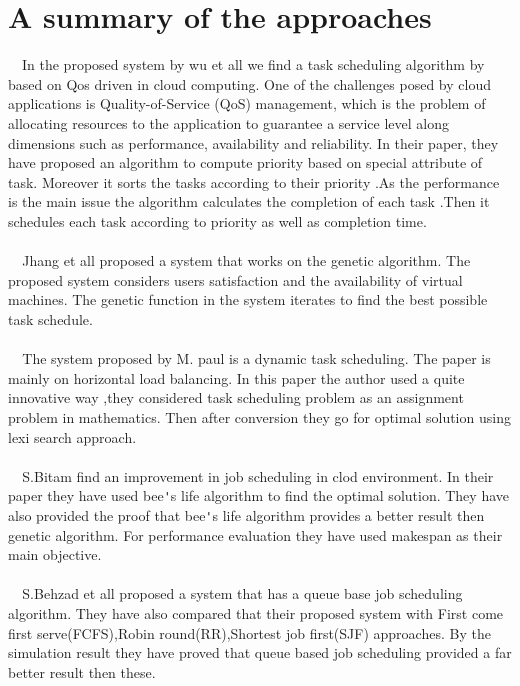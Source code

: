\documentclass{report}
\begin{document}
\tableofcontents
\listoffigures
\listoftables
\chapter{A summary of the approaches}
~~In the proposed system by wu et all  we find a task scheduling algorithm by based on Qos driven in cloud computing. One of the challenges posed by cloud applications is Quality-of-Service (QoS) management, which is the problem of allocating resources to the application to guarantee a service level along dimensions such as performance, availability and reliability. In their paper, they have proposed an algorithm to compute priority based on special attribute of task. Moreover it sorts the tasks according to their priority .As the performance is the main issue the algorithm calculates the completion of each task .Then it schedules each task according to priority as well as completion time.\cite{Wu}\\\\
\verb|  |Jhang et all proposed a system that works on the  genetic algorithm. The proposed system  considers users satisfaction and the availability of virtual machines. The genetic function in the system iterates to find the best possible task schedule.\cite{Jhang}\\\\
\verb|  |The system proposed by M. paul is a dynamic task scheduling. The paper is mainly on horizontal load balancing. In this paper the author used a quite innovative way ,they considered task scheduling problem as an assignment problem in mathematics. Then after conversion they go for optimal solution using lexi search approach.\cite{Paul}\\\\
\verb|  |S.Bitam find an improvement in job scheduling in clod environment. In their paper they have used bee\verb|'|s life algorithm to find the optimal solution. They have also provided the proof that bee\verb|'|s life algorithm provides a better result then genetic algorithm. For performance evaluation they have used makespan as their main objective.\cite{Bitam}\\\\
\verb|  |S.Behzad et all proposed a system that has a queue base job scheduling algorithm. They have also compared that their proposed system  with First come first serve(FCFS),Robin round(RR),Shortest job first(SJF) approaches. By the simulation result they have proved that queue based job scheduling provided a far better result then these.\cite{Behzad} \\\\
\end{document}
